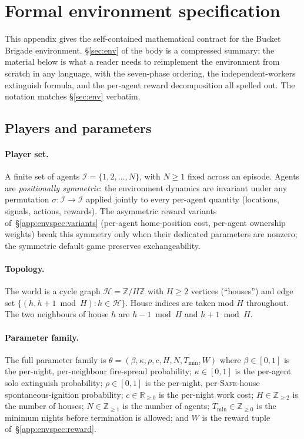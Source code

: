 \documentclass{anvil-paper}
\begin{document}



\appendix

\section{Formal environment specification}
\label{app:envspec}

This appendix gives the self-contained mathematical contract for the Bucket
Brigade environment. \S\ref{sec:env} of the body is a compressed summary;
the material below is what a reader needs to reimplement the environment
from scratch in any language, with the seven-phase ordering, the
independent-workers extinguish formula, and the per-agent reward
decomposition all spelled out. The notation matches \S\ref{sec:env}
verbatim.

\subsection{Players and parameters}
\label{app:envspec:setup}

\paragraph{Player set.} A finite set of agents
$\mathcal{I}=\{1,2,\ldots,N\}$, with $N\geq 1$ fixed across an episode.
Agents are \emph{positionally symmetric}: the environment dynamics are
invariant under any permutation $\sigma:\mathcal{I}\to\mathcal{I}$ applied
jointly to every per-agent quantity (locations, signals, actions,
rewards). The asymmetric reward variants of~\S\ref{app:envspec:variants}
(per-agent home-position cost, per-agent ownership weights) break this
symmetry only when their dedicated parameters are nonzero; the symmetric
default game preserves exchangeability.

\paragraph{Topology.} The world is a cycle graph
$\mathcal{H}=\mathbb{Z}/H\mathbb{Z}$ with $H\geq 2$ vertices (``houses'')
and edge set $\{(h,h{+}1\bmod H):h\in\mathcal{H}\}$. House indices are
taken mod $H$ throughout. The two neighbours of house $h$ are
$h{-}1\bmod H$ and $h{+}1\bmod H$.

\paragraph{Parameter family.} The full parameter family is
$\theta=(\beta,\kappa,\rho,c,H,N,T_{\min},W)$ where $\beta\in[0,1]$ is the
per-night, per-neighbour fire-spread probability; $\kappa\in[0,1]$ is the
per-agent solo extinguish probability; $\rho\in[0,1]$ is the per-night,
per-\textsc{Safe}-house spontaneous-ignition probability; $c\in\mathbb{R}_{\geq 0}$
is the per-night work cost; $H\in\mathbb{Z}_{\geq 2}$ is the number of
houses; $N\in\mathbb{Z}_{\geq 1}$ is the number of agents;
$T_{\min}\in\mathbb{Z}_{\geq 0}$ is the minimum nights before termination
is allowed; and $W$ is the reward tuple of~\S\ref{app:envspec:reward}.
\end{document}
